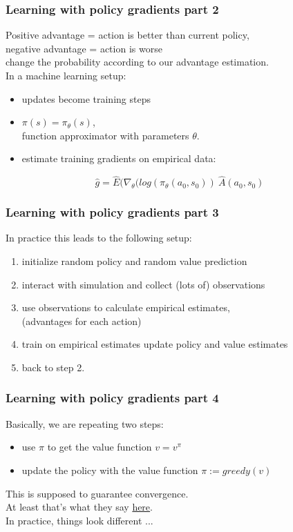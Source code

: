 \documentclass{beamer}
\begin{document}
\begin{frame}
\frametitle{Learning with policy gradients part 2}
Positive advantage = action is better than current policy,\\
negative advantage = action is worse\\
\hspace{0.5cm} \textrightarrow  \hspace{0.5cm} change the probability according to our advantage estimation.\\
\bigskip
In a machine learning setup:
\begin{itemize}
    \item updates become training steps
    \item \(\pi(s) = \pi_\theta(s)\), \\
        function approximator with parameters \(\theta\).
    \item estimate training gradients on empirical data:
\end{itemize}
\bigskip
\begin{large}
\[\hat{g}= \hat{E}(\nabla_\theta (log(\pi_\theta(a_0, s_0)) \: \hat{A}(a_0, s_0)\]
\end{large}
\end{frame}

\begin{frame}
\frametitle{Learning with policy gradients part 3}
In practice this leads to the following setup:
\begin{enumerate}
\item initialize random policy and random value prediction
\item interact with simulation and collect (lots of) observations
\item use observations to calculate empirical estimates,\\
      (advantages for each action)
\item train on empirical estimates \textrightarrow \hspace{0.2cm} update policy and value estimates
\item back to step 2.
\end{enumerate}
\end{frame}


\begin{frame}
\frametitle{Learning with policy gradients part 4}
Basically, we are repeating two steps:
\begin{itemize}
    \item use $\pi$ to get the value function $ v = v^\pi$
    \item update the policy with the value function $\pi := greedy(v)$
\end{itemize}
\bigskip
This is supposed to guarantee convergence. \\
At least that's what they say \href{http://www0.cs.ucl.ac.uk/staff/d.silver/web/Teaching_files/DP.pdf}{here}.\\
\bigskip
In practice, things look different ...
\end{frame}
\end{document}
